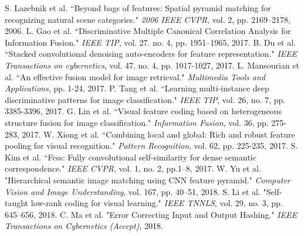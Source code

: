 \documentclass[journal]{IEEEtran}
\begin{document}
\begin{thebibliography}{1}
S. Lazebnik et al. ``Beyond bags of features: Spatial pyramid matching for recognizing natural scene categories." \emph{2006 IEEE CVPR}, vol. 2, pp. 2169--2178, 2006.
L. Gao et al. ``Discriminative Multiple Canonical Correlation Analysis for Information Fusion." \emph{IEEE TIP}, vol. 27. no. 4, pp. 1951--1965, 2017.
B. Du et al. ``Stacked convolutional denoising auto-encoders for feature representation." \emph{IEEE Transactions on cybernetics}, vol. 47, no. 4, pp. 1017-1027, 2017.
 L. Mansourian et al. ``An effective fusion model for image retrieval." \emph{Multimedia Tools and Applications}, pp. 1-24, 2017.
 P. Tang et al. ``Learning multi-instance deep discriminative patterns for image classification." \emph{IEEE TIP}, vol. 26, no. 7, pp. 3385-3396, 2017.
 G. Lin et al. ``Visual feature coding based on heterogeneous structure fusion for image classification." \emph{Information Fusion}, vol. 36, pp. 275-283, 2017.
 W. Xiong et al. ``Combining local and global: Rich and robust feature pooling for visual recognition." \emph{Pattern Recognition}, vol. 62, pp. 225-235, 2017.
 S. Kim et al. ``Fcss: Fully convolutional self-similarity for dense semantic correspondence." \emph{IEEE CVPR}, vol. 1, no. 2, pp.1--8, 2017.
 W. Yu et al. "Hierarchical semantic image matching using CNN feature pyramid." \emph{Computer Vision and Image Understanding}, vol. 167, pp. 40--51, 2018.
 S. Li et al. "Self-taught low-rank coding for visual learning." \emph{IEEE TNNLS}, vol. 29, no. 3, pp. 645--656, 2018.
C. Ma et al. "Error Correcting Input and Output Hashing." \emph{IEEE Transactions on Cybernetics (Accept)}, 2018.











\end{thebibliography}
\end{document}
